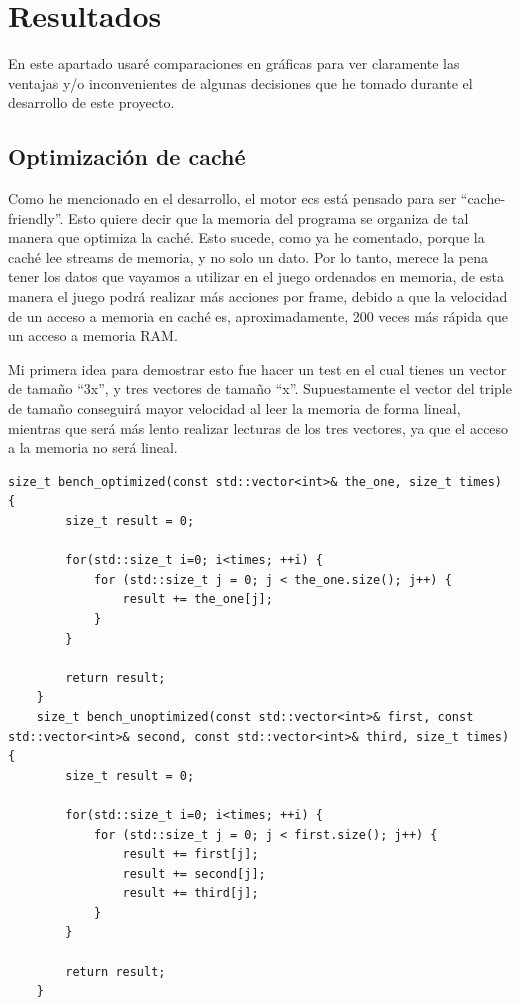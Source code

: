 \chapter{Resultados}
\label{resultados}
En este apartado usaré comparaciones en gráficas para ver claramente las ventajas y/o inconvenientes de algunas decisiones que he tomado durante el desarrollo de este proyecto.

\section{Optimización de caché}
Como he mencionado en el desarrollo, el motor \gls{ecs} está pensado para ser ``cache-friendly''. Esto quiere decir que la memoria del programa se organiza de tal manera que optimiza la caché. Esto sucede, como ya he comentado, porque la caché lee streams de memoria, y no solo un dato. Por lo tanto, merece la pena tener los datos que vayamos a utilizar en el juego ordenados en memoria, de esta manera el juego podrá realizar más acciones por frame, debido a que la velocidad de un acceso a memoria en caché es, aproximadamente, 200 veces más rápida que un acceso a memoria RAM.

Mi primera idea para demostrar esto fue hacer un test en el cual tienes un vector de tamaño ``3x'', y tres vectores de tamaño ``x''. Supuestamente el vector del triple de tamaño conseguirá mayor velocidad al leer la memoria de forma lineal, mientras que será más lento realizar lecturas de los tres vectores, ya que el acceso a la memoria no será lineal.
\begin{lstlisting}[style=C-color, caption={Caché optimizada vs sin optimizar. Primer intento},label=cache-optimization-first]
	size_t bench_optimized(const std::vector<int>& the_one, size_t times) {
		size_t result = 0;
		
		for(std::size_t i=0; i<times; ++i) {
			for (std::size_t j = 0; j < the_one.size(); j++) {
				result += the_one[j];
			}
		}
		
		return result;
	}
	size_t bench_unoptimized(const std::vector<int>& first, const std::vector<int>& second, const std::vector<int>& third, size_t times) {
		size_t result = 0;
		
		for(std::size_t i=0; i<times; ++i) {
			for (std::size_t j = 0; j < first.size(); j++) {
				result += first[j];
				result += second[j];
				result += third[j];
			}
		}
		
		return result;
	}
\end{lstlisting}

